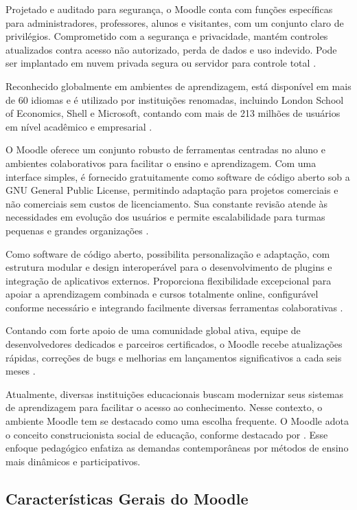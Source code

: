 Projetado e auditado para segurança, o Moodle conta com funções específicas para administradores, professores, alunos e visitantes, com um conjunto claro de privilégios. Comprometido com a segurança e privacidade, mantém controles atualizados contra acesso não autorizado, perda de dados e uso indevido. Pode ser implantado em nuvem privada segura ou servidor para controle total \cite{moodle}. 

Reconhecido globalmente em ambientes de aprendizagem, está disponível em mais de 60 idiomas e é utilizado por instituições renomadas, incluindo London School of Economics, Shell e Microsoft, contando com mais de 213 milhões de usuários em nível acadêmico e empresarial \cite{moodle}. 

O Moodle oferece um conjunto robusto de ferramentas centradas no aluno e ambientes colaborativos para facilitar o ensino e aprendizagem. Com uma interface simples, é fornecido gratuitamente como software de código aberto sob a GNU General Public License, permitindo adaptação para projetos comerciais e não comerciais sem custos de licenciamento. Sua constante revisão atende às necessidades em evolução dos usuários e permite escalabilidade para turmas pequenas e grandes organizações \cite{moodle}. 

Como software de código aberto, possibilita personalização e adaptação, com estrutura modular e design interoperável para o desenvolvimento de plugins e integração de aplicativos externos. Proporciona flexibilidade excepcional para apoiar a aprendizagem combinada e cursos totalmente online, configurável conforme necessário e integrando facilmente diversas ferramentas colaborativas \cite{moodle}. 

Contando com forte apoio de uma comunidade global ativa, equipe de desenvolvedores dedicados e parceiros certificados, o Moodle recebe atualizações rápidas, correções de bugs e melhorias em lançamentos significativos a cada seis meses \cite{moodle}.

Atualmente, diversas instituições educacionais buscam modernizar seus sistemas de aprendizagem para facilitar o acesso ao conhecimento. Nesse contexto, o ambiente Moodle tem se destacado como uma escolha frequente. O Moodle adota o conceito construcionista social de educação, conforme destacado por \cite[p.~22]{galasso}. Esse enfoque pedagógico enfatiza as demandas contemporâneas por métodos de ensino mais dinâmicos e participativos.

\subsection{\textbf{Características Gerais do Moodle}}

